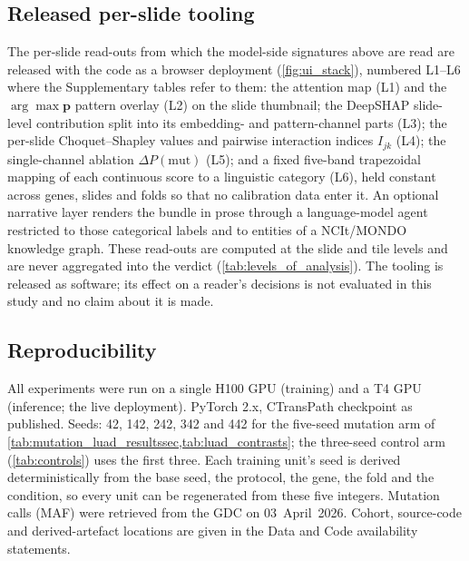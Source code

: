 \subsection*{Released per-slide tooling}

The per-slide read-outs from which the model-side signatures above are
read are released with the code as a browser deployment
(\cref{fig:ui_stack}), numbered L1--L6 where the Supplementary tables
refer to them: the \abmil{} attention map (L1) and the
$\arg\max\mathbf{p}$ pattern overlay (L2) on the slide thumbnail; the
DeepSHAP\cite{lundberg2017shap} slide-level contribution split into its
embedding- and pattern-channel parts (L3); the per-slide Choquet--Shapley
values and pairwise interaction indices
$I_{jk}$ (L4);\cite{shapley1953value,grabisch1996application} the
single-channel ablation $\Delta P(\mathrm{mut})$ (L5); and a fixed
five-band trapezoidal mapping of each continuous score to a linguistic
category (L6), held constant across genes, slides and folds so that no
calibration data enter it. An optional narrative layer renders the bundle in prose through
a language-model agent restricted to those categorical labels and to
entities of a NCIt/MONDO knowledge
graph.\cite{sioutos2007ncit,mondo_shefchek2020} These read-outs are
computed at the slide and tile levels and are never aggregated into the
verdict (\cref{tab:levels_of_analysis}). The tooling is released as
software; its effect on a reader's decisions is not evaluated in this
study and no claim about it is made.

\subsection*{Reproducibility}

All experiments were run on a single H100 GPU (training) and
a T4 GPU (inference; the live \lchai{} deployment).
PyTorch 2.x, CTransPath checkpoint as published.\cite{wang2022ctranspath}
Seeds: 42, 142, 242, 342 and 442 for the five-seed mutation arm of
\cref{tab:mutation_luad_resultssec,tab:luad_contrasts}; the three-seed
control arm (\cref{tab:controls}) uses the first three. Each training
unit's seed is derived deterministically from the base seed, the
protocol, the gene, the fold and the condition, so every unit can be
regenerated from these five integers.
Mutation calls (MAF) were retrieved from the GDC on 03~April~2026.
Cohort, source-code and derived-artefact locations are given in the
Data and Code availability statements.


